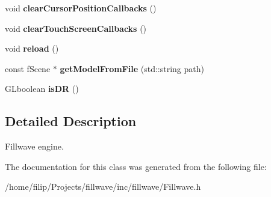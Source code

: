\begin{DoxyCompactItemize}
\item 
\hypertarget{classfillwave_1_1Engine_add15877452d0e34f846aeca2ed512e34}{}void {\bfseries clear\+Cursor\+Position\+Callbacks} ()\label{classfillwave_1_1Engine_add15877452d0e34f846aeca2ed512e34}

\item 
\hypertarget{classfillwave_1_1Engine_ad353015eea27d0ec2ed9a16bff58f305}{}void {\bfseries clear\+Touch\+Screen\+Callbacks} ()\label{classfillwave_1_1Engine_ad353015eea27d0ec2ed9a16bff58f305}

\item 
\hypertarget{classfillwave_1_1Engine_ac1f51045c9dd664740800ada09656c36}{}void {\bfseries reload} ()\label{classfillwave_1_1Engine_ac1f51045c9dd664740800ada09656c36}

\item 
\hypertarget{classfillwave_1_1Engine_a29a0fe99323dc6150ad3cddfb49e752f}{}const f\+Scene $\ast$ {\bfseries get\+Model\+From\+File} (std\+::string path)\label{classfillwave_1_1Engine_a29a0fe99323dc6150ad3cddfb49e752f}

\item 
\hypertarget{classfillwave_1_1Engine_a3626604d8a6f5b0f7dbfffab5617c8ab}{}G\+Lboolean {\bfseries is\+D\+R} ()\label{classfillwave_1_1Engine_a3626604d8a6f5b0f7dbfffab5617c8ab}

\end{DoxyCompactItemize}


\subsection{Detailed Description}
Fillwave engine. 

The documentation for this class was generated from the following file\+:\begin{DoxyCompactItemize}
\item 
/home/filip/\+Projects/fillwave/inc/fillwave/Fillwave.\+h\end{DoxyCompactItemize}
